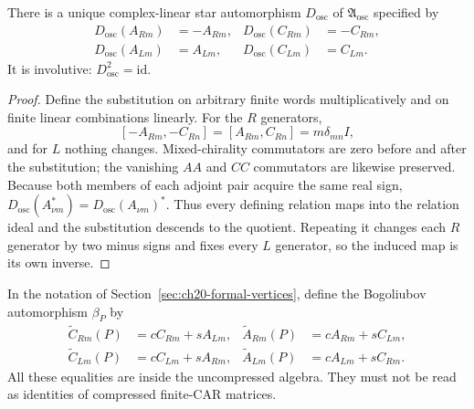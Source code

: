 \begin{proposition}
\label{prop:ch20c-Dosc}
There is a unique complex-linear star automorphism
$D_{\mathrm{osc}}$ of $\mathfrak A_{\mathrm{osc}}$ specified by
\begin{align}
 D_{\mathrm{osc}}(A_{Rm})&=-A_{Rm},&
 D_{\mathrm{osc}}(C_{Rm})&=-C_{Rm},\nonumber\\
 D_{\mathrm{osc}}(A_{Lm})&= A_{Lm},&
 D_{\mathrm{osc}}(C_{Lm})&= C_{Lm}.
 \label{eq:ch20c-Dosc}
\end{align}
It is involutive: $D_{\mathrm{osc}}^2=\mathrm{id}$.
\end{proposition}
\begin{proof}
Define the substitution on arbitrary finite words multiplicatively
and on finite linear combinations linearly.  For the $R$ generators,
\[
 [-A_{Rm},-C_{Rn}]=[A_{Rm},C_{Rn}]
 =m\delta_{mn}I,
\]
and for $L$ nothing changes.  Mixed-chirality commutators are zero
before and after the substitution; the vanishing $AA$ and $CC$
commutators are likewise preserved.  Because both members of each
adjoint pair acquire the same real sign,
$D_{\mathrm{osc}}(A_{\nu m}^*)
 =D_{\mathrm{osc}}(A_{\nu m})^*$.
Thus every defining relation maps into the relation ideal and the
substitution descends to the quotient.  Repeating it changes each
$R$ generator by two minus signs and fixes every $L$ generator,
so the induced map is its own inverse.
\end{proof}

In the notation of Section~\ref{sec:ch20-formal-vertices}, define the
Bogoliubov automorphism $\beta_P$ by
\begin{align}
 \widetilde C_{Rm}(P)&=cC_{Rm}+sA_{Lm},&
 \widetilde A_{Rm}(P)&=cA_{Rm}+sC_{Lm},\nonumber\\
 \widetilde C_{Lm}(P)&=cC_{Lm}+sA_{Rm},&
 \widetilde A_{Lm}(P)&=cA_{Lm}+sC_{Rm}.
 \label{eq:ch20c-dressed}
\end{align}
All these equalities are inside the uncompressed algebra.  They
must not be read as identities of compressed finite-CAR matrices.

